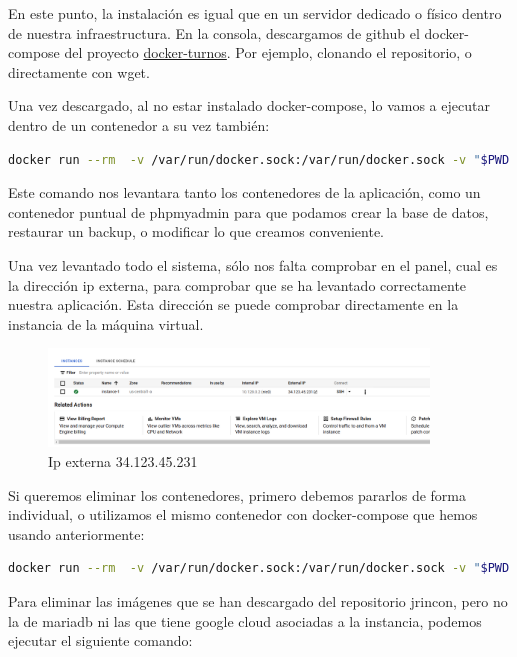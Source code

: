\documentclass[11pt,spanish,listoffigures,listoftables]{tfgetsinf}
\begin{document}
En este punto, la instalación es igual que en un servidor dedicado o físico dentro de nuestra infraestructura. En la consola, descargamos de github el docker-compose del proyecto \href{https://github.com/jrinconm/docker-turnos/}{docker-turnos}.
Por ejemplo, clonando el repositorio, o directamente con wget. 

Una vez descargado, al no estar instalado docker-compose, lo vamos a ejecutar dentro de un contenedor a su vez también:

\begin{lstlisting}[language=bash, caption={Comando docker para lanzar docker-compose}]
docker run --rm  -v /var/run/docker.sock:/var/run/docker.sock -v "$PWD:$PWD"   -w="$PWD"  docker/compose:1.24.0 up \d
\end{lstlisting}
Este comando nos levantara tanto los contenedores de la aplicación, como un contenedor puntual de phpmyadmin para que podamos crear la base de datos, restaurar un backup, o modificar lo que creamos conveniente.

Una vez levantado todo el sistema, sólo nos falta comprobar en el panel, cual es la dirección ip externa, para comprobar que se ha levantado correctamente nuestra aplicación. Esta dirección se puede comprobar directamente en la instancia de la máquina virtual.

\begin{figure}[H] %
  \centering
   \includegraphics[width=0.90\textwidth]{img/ipexterna.png}
   \caption{Ip externa 34.123.45.231}
   \label{fig:ipexterna}
 \end{figure}

Si queremos eliminar los contenedores, primero debemos pararlos de forma individual, o utilizamos el mismo contenedor con docker-compose que hemos usando anteriormente:

\begin{lstlisting}[language=bash, caption={Comando docker para parar docker-compose}]
docker run --rm  -v /var/run/docker.sock:/var/run/docker.sock -v "$PWD:$PWD"   -w="$PWD"  docker/compose:1.24.0 down
\end{lstlisting}

Para eliminar las imágenes que se han descargado del repositorio jrincon, pero no la de mariadb ni las que tiene google cloud asociadas a la instancia, podemos ejecutar el siguiente comando:
\end{document}
